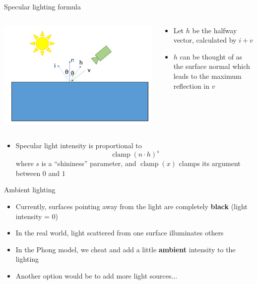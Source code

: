 \begin{frame}{Specular lighting formula}
	\begin{columns}
		\begin{column}{0.33\textwidth}
			\includegraphics[width=\textwidth]{specular_angle}
		\end{column}
		\begin{column}{0.65\textwidth}
			\begin{itemize}
				\pause\item Let $h$ be the halfway vector, calculated by $i+v$
				\pause\item $h$ can be thought of as the surface normal which leads to the maximum reflection in $v$
			\end{itemize}
		\end{column}
	\end{columns}
	\begin{itemize}
		\pause\item Specular light intensity is proportional to
		$$ \operatorname{clamp}(n \cdot h)^s $$
		where $s$ is a ``shininess'' parameter, and $\operatorname{clamp}(x)$ clamps its argument between $0$ and $1$
	\end{itemize}
\end{frame}

\begin{frame}{Ambient lighting}
	\begin{itemize}
		\pause\item Currently, surfaces pointing away from the light are completely \textbf{black} (light intensity = 0)
		\pause\item In the real world, light scattered from one surface illuminates others
		\pause\item In the Phong model, we cheat and add a little \textbf{ambient} intensity to the lighting
		\pause\item Another option would be to add more light sources...
	\end{itemize}
\end{frame}

